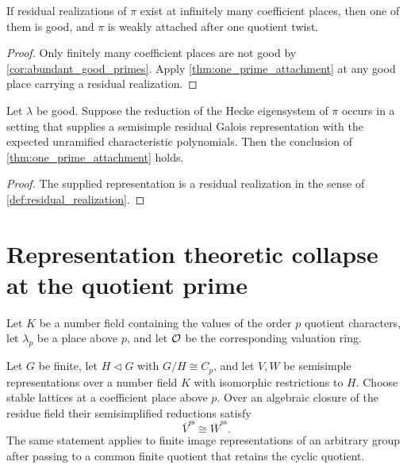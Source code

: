 \begin{corollary}\label{cor:infinitely_many_residual}
If residual realizations of \(\pi\) exist at infinitely many coefficient places, then one of them is good, and \(\pi\) is weakly attached after one quotient twist.
\end{corollary}

\begin{proof}
Only finitely many coefficient places are not good by \cref{cor:abundant_good_primes}. Apply \cref{thm:one_prime_attachment} at any good place carrying a residual realization.
\end{proof}

\begin{corollary}\label{cor:congruent_cohomological}
Let \(\lambda\) be good. Suppose the reduction of the Hecke eigensystem of \(\pi\) occurs in a setting that supplies a semisimple residual Galois representation with the expected unramified characteristic polynomials. Then the conclusion of \cref{thm:one_prime_attachment} holds.
\end{corollary}

\begin{proof}
The supplied representation is a residual realization in the sense of \cref{def:residual_realization}.
\end{proof}

\section{Representation theoretic collapse at the quotient prime}\label{sec:residual_collapse}

Let \(K\) be a number field containing the values of the order \(p\) quotient characters, let \(\lambda_p\) be a place above \(p\), and let \(\mathcal O\) be the corresponding valuation ring.

\begin{theorem}\label{thm:semisimple_label_collapse}
Let \(G\) be finite, let \(H\triangleleft G\) with \(G/H\cong C_p\), and let \(V,W\) be semisimple representations over a number field \(K\) with isomorphic restrictions to \(H\). Choose stable lattices at a coefficient place above \(p\). Over an algebraic closure of the residue field their semisimplified reductions satisfy
\[
 \overline V^{\mathrm{ss}}\cong\overline W^{\mathrm{ss}}.
\]
The same statement applies to finite image representations of an arbitrary group after passing to a common finite quotient that retains the cyclic quotient.
\end{theorem}

